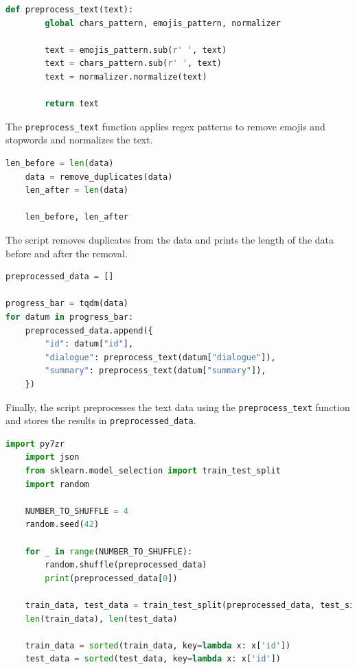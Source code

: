 \documentclass{solutionclass} %
\begin{document}
\begin{lstlisting}[language=Python]
	def preprocess_text(text):
		global chars_pattern, emojis_pattern, normalizer
	
		text = emojis_pattern.sub(r' ', text)
		text = chars_pattern.sub(r' ', text)
		text = normalizer.normalize(text)
	
		return text
	\end{lstlisting}


\begin{solution}
The \texttt{preprocess\_text} function applies regex patterns to remove emojis and stopwords and normalizes the text.
\end{solution}


\begin{lstlisting}[language=Python]
	len_before = len(data)
	data = remove_duplicates(data)
	len_after = len(data)
	
	len_before, len_after
	\end{lstlisting}


\begin{solution}
The script removes duplicates from the data and prints the length of the data before and after the removal.
\end{solution}


\begin{lstlisting}[language=Python]
preprocessed_data = []

progress_bar = tqdm(data)
for datum in progress_bar:
    preprocessed_data.append({
        "id": datum["id"],
        "dialogue": preprocess_text(datum["dialogue"]),
        "summary": preprocess_text(datum["summary"]),
    })
\end{lstlisting}

\begin{solution}
Finally, the script preprocesses the text data using the \texttt{preprocess\_text} function and stores the results in \texttt{preprocessed\_data}.
\end{solution}



\begin{lstlisting}[language=Python]
	import py7zr
	import json
	from sklearn.model_selection import train_test_split
	import random
	
	NUMBER_TO_SHUFFLE = 4
	random.seed(42)
	
	for _ in range(NUMBER_TO_SHUFFLE):
		random.shuffle(preprocessed_data)
		print(preprocessed_data[0])
	
	train_data, test_data = train_test_split(preprocessed_data, test_size=0.1, random_state=42)
	len(train_data), len(test_data)
	
	train_data = sorted(train_data, key=lambda x: x['id'])
	test_data = sorted(test_data, key=lambda x: x['id'])
	\end{lstlisting}
\end{document}
